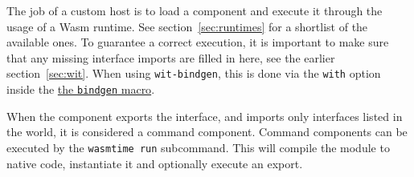 The job of a custom host is to load a component and execute it through the usage of a \gls{Wasm} runtime. See section~\ref{sec:runtimes} for a shortlist of the available ones. To guarantee a correct execution, it is important to make sure that any missing interface imports are filled in here, see the earlier section~\ref{sec:wit}. When using \texttt{wit-bindgen}, this is done via the \texttt{with} option inside the \href{https://docs.rs/wasmtime/latest/wasmtime/component/macro.bindgen.html}{the \texttt{bindgen} macro}.

When the component exports the  interface, and imports only interfaces listed in the  world, it is considered a command component. Command components can be executed by the \texttt{wasmtime run} subcommand. This will compile the module to native code, instantiate it and optionally execute an export.

